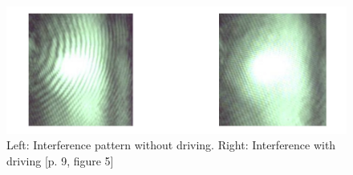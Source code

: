 \documentclass[12pt,a4paper]{article}
\begin{document}
\begin{figure}[H]
	\centering
	\includegraphics[scale=1]{../figures/interference.png}
	\caption{Left: Interference pattern without driving. Right: Interference with driving \cite{physikwiki}[p. 9, figure 5]}
	\label{fig:pattern}
\end{figure}
\end{document}

